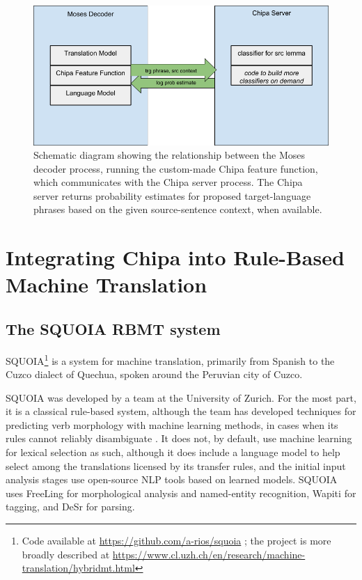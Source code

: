 \begin{figure}
  \begin{centering}
  \includegraphics[width=15cm]{moses-chipa-diagram.png}
  \end{centering}
  \caption{Schematic diagram showing the relationship between the Moses decoder
  process, running the custom-made Chipa feature function, which communicates
  with the Chipa server process. The Chipa server returns probability
  estimates for proposed target-language phrases based on the given
  source-sentence context, when available.}
  \label{fig:moses-chipa-diagram}
\end{figure}

\section{Integrating Chipa into Rule-Based Machine Translation}

\subsection{The SQUOIA RBMT system}
SQUOIA\footnote{Code available at \url{https://github.com/a-rios/squoia} ;
the project is more broadly described at
\url{https://www.cl.uzh.ch/en/research/machine-translation/hybridmt.html}}
is a system for machine translation, primarily from Spanish to the Cuzco
dialect of Quechua, spoken around the Peruvian city of Cuzco.

SQUOIA was developed by a team at the University of Zurich. For the most
part, it is a classical rule-based system, although the team has
developed techniques for predicting verb morphology with machine
learning methods, in cases when its rules cannot reliably disambiguate
\cite{riosgonzales-gohring:2013:HyTra}. It does not, by default, use machine
learning for lexical selection as such,
although it does include a language model to help select among the
translations licensed by its transfer rules, and the initial input analysis
stages use open-source NLP tools based on learned models. SQUOIA uses
FreeLing \cite{padro12} for morphological analysis and named-entity
recognition, Wapiti \cite{lavergne2010practical} for tagging, and DeSr
\cite{attardi-EtAl:2007:EMNLP-CoNLL2007} for parsing.

